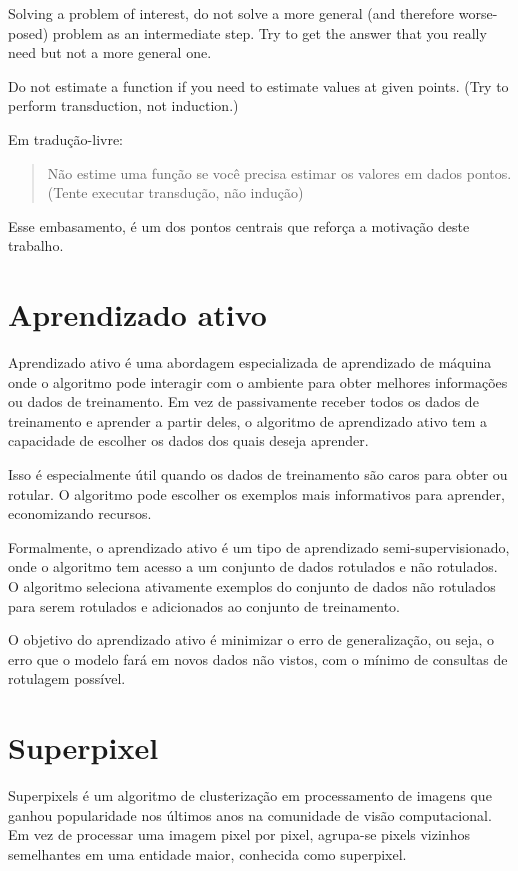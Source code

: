 \begin{displayquote}

  Solving a problem of interest, do not solve a more general (and therefore worse-
  posed) problem as an intermediate step. Try to get the answer that you really need
  but not a more general one.

  Do not estimate a function if you need to estimate values at given
  points. (Try to perform transduction, not induction.)

\end{displayquote}

Em tradução-livre: \blockquote{Não estime uma função se você precisa estimar
os valores em dados pontos. (Tente executar transdução, não
indução)}. Esse embasamento, é um dos pontos centrais que reforça a motivação deste trabalho.


\section{Aprendizado ativo}\label{sec:teorica-aprendizado-ativo}

Aprendizado ativo é uma abordagem especializada de aprendizado de
máquina onde o algoritmo pode interagir com o ambiente para obter
melhores informações ou dados de treinamento. Em vez de passivamente
receber todos os dados de treinamento e aprender a partir deles, o
algoritmo de aprendizado ativo tem a capacidade de escolher os dados
dos quais deseja aprender.

Isso é especialmente útil quando os dados de treinamento são caros
para obter ou rotular. O algoritmo pode escolher os exemplos mais
informativos para aprender, economizando recursos.

Formalmente, o aprendizado ativo é um tipo de aprendizado
semi-supervisionado, onde o algoritmo tem acesso a um conjunto de
dados rotulados e não rotulados. O algoritmo seleciona ativamente
exemplos do conjunto de dados não rotulados para serem rotulados e
adicionados ao conjunto de treinamento.

O objetivo do aprendizado ativo é minimizar o erro de generalização,
ou seja, o erro que o modelo fará em novos dados não vistos, com o
mínimo de consultas de rotulagem possível.

\section{Superpixel}\label{sec:teorica-superpixel}

Superpixels é um algoritmo de clusterização em processamento de imagens que ganhou
popularidade nos últimos anos na comunidade de visão computacional. Em
vez de processar uma imagem pixel por pixel, agrupa-se pixels
vizinhos semelhantes em uma entidade maior, conhecida como superpixel.

